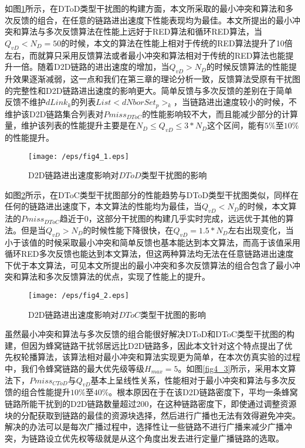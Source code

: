\documentclass[figurelist,tablelist,algorithmlist,nomlist,masters]{seuthesix}
\begin{document}
	如图\ref{fig4_1}所示，在DToD类型干扰图的构建方面，本文所采取的最小冲突和算法和多次反馈的组合，在任意的链路进出速度下性能表现均为最佳。本文所提出的最小冲突和算法与多次反馈算法在性能上远好于RED算法和循环RED算法，当$Q_{vD} < N_D = 50$的时候，本文的算法在性能上相对于传统的RED算法提升了10倍左右，而就算只采用反馈算法或者最小冲突和算法相对于传统的RED算法也能提升一倍。随着D2D链路的进出速度的增加，当$Q_{vD} > N_D$的时候反馈算法的性能提升效果逐渐减弱，这一点和我们在第三章的理论分析一致，反馈算法受原有干扰图的完整性和D2D链路进出速度的影响更大。简单反馈与多次反馈的差别在于简单反馈不维护$dLink_k$的列表$List < dNborSet_{p}{ > _k}$，当链路进出速度较小的时候，不维护该D2D链路集合列表对$Pmiss_{DToC}$的性能影响较不大，而且能减少部分的计算量，维护该列表的性能提升主要是在$N_D \le Q_{vD} \le 3 * N_D$这个区间，能有$5\%$至$10\%$的性能提升。
	
	\begin{figure}[!h]
		\centering
		\texttt{[image: /eps/fig4\_1.eps]}
		\caption{D2D链路进出速度影响对$DToD$类型干扰图的影响}
		\label{fig4_1}
	\end{figure}
	
	如图\ref{fig4_2}所示，在DToC类型干扰图部分的性能趋势与DToD类型干扰图类似，同样在任何的链路进出速度下，本文算法的性能均为最佳，当$Q_{vD} < N_D$的时候，本文算法的$Pmiss_{DToC}$趋近于0，这部分干扰图的构建几乎实时完成，远远优于其他的算法。但是当$Q_{vD} > N_D$的时候性能下降很快，在$Q_{vD} = 1.5 * N_D$左右出现变化，当小于该值的时候采取最小冲突和简单反馈也基本能达到本文算法，而高于该值采用循环RED多次反馈也能达到本文算法，但这两种算法均无法在任意链路进出速度下优于本文算法，可见本文所提出的最小冲突和多次反馈算法的组合包含了最小冲突和算法和多次反馈算法的优点，实现了性能上的提升。
	
	\begin{figure}[!h]
		\centering
		\texttt{[image: /eps/fig4\_2.eps]}
		\caption{D2D链路进出速度影响对$DToC$类型干扰图的影响}
		\label{fig4_2}
	\end{figure}
	
	
	虽然最小冲突和算法与多次反馈的组合能很好解决DToD和DToC类型干扰图的构建，但因为蜂窝链路干扰邻居远比D2D链路多，因此本文针对这个特点提出了优先权轮播算法，该算法相对最小冲突和算法实现更为简单，在本次仿真实验的过程中，我们令蜂窝链路的最大优先级等级$H_{max} = 5$。如图\ref{fig4_3}所示，采用本文算法下，$Pmiss_{CToD}$与$Q_{vD}$基本上呈线性关系，性能相对于最小冲突和算法与多次反馈的组合性能提升$10\%$至$40\%$。根本原因在于在该D2D链路密度下，平均一条蜂窝链路所能干扰到的D2D链路数量超过200，在这种链路密度下，即使通过调整资源块的分配获取到链路的最佳的资源块选择，然后进行广播也无法有效得避免冲突。解决的办法可以是每次广播过程中，选择性让一些链路不进行广播来减少广播冲突，为链路设立优先权等级就是从这个角度出发去进行定量广播链路的选取。
	
\end{document}
